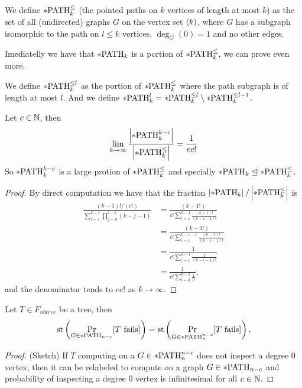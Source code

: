 \begin{defi}
We define $*\text{PATH}^\leq_k$ (the pointed paths on $k$ vertices of length at most $k$) as the set of all (undirected) graphs $G$ on the vertex set $\langle k)$, where $G$ has a subgraph isomorphic to the path on $l\leq k$ vertices, $\deg_G(0)=1$ and no other edges.
\end{defi}

Imediatelly we have that $*\text{PATH}_k$ is a portion of $*\text{PATH}^\leq_k,$ we can prove even more.

\begin{defi}
We define $*\text{PATH}_k^{\leq l}$ as the portion of $*\text{PATH}^\leq_k$ where the path subgraph is of length at most $l$. And we define $*\text{PATH}_k^{l}=*\text{PATH}_k^{\leq l}\setminus *\text{PATH}_k^{\leq l-1}$.

\end{defi}


\begin{lemm}
Let $c\in \mathbb{N}$, then 
\[\lim_{k\to\infty}\frac{\left|{*\text{PATH}_k^{k-c}}\right|}{\left|{*\text{PATH}^\leq_k}\right|}=\frac{1}{ec!}\]
So $*\text{PATH}_k^{k-c}$ is a large protion of $*\text{PATH}^\leq_k$ and specially $*\text{PATH}_k\trianglelefteq *\text{PATH}^\leq_k$.
\end{lemm}
\begin{proof}
By direct computation we have that the fraction $\left|{*\text{PATH}_k}\right|/\left|{*\text{PATH}^\leq_k}\right|$ is
\begin{align}
\frac{(k-1)!/(c!)}{\sum_{i=1}^{k-1}\prod_{j=0}^{i-1}(k-j-1)}&=\frac{(k-1!)}{c!\sum_{i=1}^{k-1}\frac{(k-1)!}{(k-i-1)!}}\\
&=\frac{(k-1!)}{c!\sum_{i=1}^{k-c-1}\frac{(k-1)!}{(k-i-1)!}}\\
&=\frac{1}{c!\sum_{i=1}^{k-1}\frac{1}{(k-i-1)!}}\\
&=\frac{1}{c!\sum_{i=0}^{k-2}\frac{1}{i!}},
\end{align}
and the denominator tends to $ec!$ as $k\to\infty$.
\end{proof}

\begin{lemm}\label{lemmpathnnc}
Let $T\in F_{nbtree}$ be a tree, then
\[\text{st}\left(\Pr_{G\in*\text{PATH}_{n-c}}[\text{$T$ fails}]\right )=\text{st}\left(\Pr_{G\in*\text{PATH}_{n}^{n-c}}[\text{$T$ fails}]\right).\]
\end{lemm}
\begin{proof}(Sketch)
If $T$ computing on a $G\in*\text{PATH}_n^{n-c}$ does not inspect a degree 0 vertex, then it can be relabeled to compute on a graph $G\in*\text{PATH}_{n-c}$ and probability of inspecting a degree 0 vertex is infinitesimal for all $c\in \mathbb{N}$.
\end{proof}


